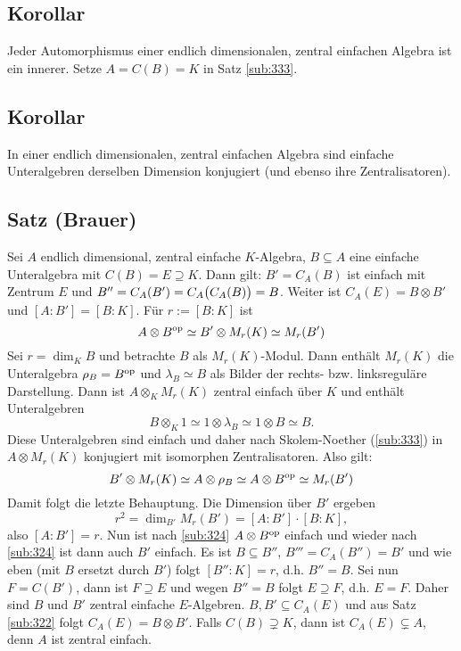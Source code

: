 \subsection{Korollar} %
\label{sub:334}
Jeder Automorphismus einer endlich dimensionalen, zentral einfachen Algebra ist ein innerer.
Setze $A=C(B) = K$ in Satz \ref{sub:333}. \bewende

\subsection{Korollar} %
\label{sub:335}
In einer endlich dimensionalen, zentral einfachen Algebra sind einfache Unteralgebren derselben Dimension konjugiert (und ebenso ihre Zentralisatoren).

\subsection{Satz (Brauer)} %
\label{sub:336}
Sei $A$ endlich dimensional, zentral einfache $K$-Algebra, $B \subseteq A$ eine einfache Unteralgebra mit $C(B)= E \supseteq K$. Dann gilt: $B' = C_A(B)$ ist einfach mit
Zentrum $E$ und $B'' = C_A(B') = C_A\enbrace[\big]{C_A(B)} = B$. Weiter ist $C_A(E) = B \otimes B'$ und $[A : B'] = [B :K]$. Für $r := [B:K]$ ist 
\[
	A \otimes B^\op \simeq B' \otimes  M_r(K) \simeq M_r(B')
\]
Sei $r= \dim_K B$ und betrachte $B$ als $M_r(K)$-Modul. Dann enthält $M_r(K)$ die Unteralgebra $\rho_B = B^\op$ und $\lambda_B  \simeq B$ als Bilder der rechts- bzw. 
linksreguläre Darstellung. Dann ist $A \otimes_K M_r(K)$ zentral einfach über $K$ und enthält Unteralgebren
\[
	B \otimes_K 1  \simeq 1 \otimes \lambda_B \simeq 1 \otimes B \simeq B.
\]
Diese Unteralgebren sind einfach und daher nach Skolem-Noether (\ref{sub:333}) in $A \otimes M_r(K)$ konjugiert mit isomorphen Zentralisatoren. Also gilt:  
\[
	B' \otimes M_r(K) \simeq A \otimes \rho_B \simeq A \otimes B^\op \simeq M_r(B')
\]
Damit folgt die letzte Behauptung. Die Dimension über $B'$ ergeben
\[
	r^2 = \dim_{B'} M_r(B') = [A:B'] \cdot [B:K],
\]
also $[A:B']=r$. Nun ist nach \ref{sub:324} $A \otimes B^\op$ einfach und wieder nach \ref{sub:324} ist dann auch $B'$ einfach.
Es ist $B \subseteq B''$, $B''' = C_A(B'') = B'$ und wie eben (mit $B$ ersetzt durch $B'$) folgt $[B'' : K]=r$, d.h. $B''=B$. Sei nun $F= C(B')$, dann ist $F \supseteq E$
und wegen $B''=B$ folgt $E \supseteq F$, d.h. $E=F$. Daher sind $B$ und $B'$ zentral einfache $E$-Algebren. $B,B' \subseteq C_A(E)$ und aus Satz \ref{sub:322} folgt
$C_A(E)= B \otimes B'$. \bewende
{}
Falls $C(B) \supsetneq K$, dann ist $C_A(E) \subsetneq A$, denn $A$ ist zentral einfach.

